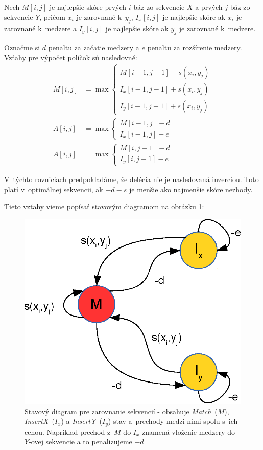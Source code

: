 Nech $M[i,j]$ je najlepšie skóre prvých $i$ báz zo sekvencie $X$ a prvých $j$ báz zo sekvencie $Y$, pričom $x_i$ je zarovnané k~$y_j$, $I_x[i,j]$ je najlepšie skóre ak $x_i$ je zarovnané k~medzere a $I_y[i,j]$ je najlepšie skóre ak $y_j$ je zarovnané k~medzere.

Označme si $d$ penaltu za začatie medzery a $e$ penaltu za rozšírenie medzery. Vzťahy pre výpočet políčok sú nasledovné:
\begin{align*}
M[i,j] &= \max \left\{
\begin{array}{l}
M[i-1,j-1]+s(x_i, y_j)\\
I_x[i-1,j-1]+s(x_i, y_j)\\
I_y[i-1,j-1]+s(x_i, y_j)
\end{array} \right.\\
A[i,j] &= \max \left\{
\begin{array}{l}
M[i-1,j]-d\\
I_x[i-1,j]-e
\end{array} \right.\\
A[i,j] &= \max \left\{
\begin{array}{l}
M[i,j-1]-d\\
I_y[i,j-1]-e
\end{array} \right.
\end{align*}

V~týchto rovniciach predpokladáme, že delécia nie je nasledovaná inzerciou. Toto platí v~optimálnej sekvencii, ak $-d-s$ je menšie ako najmenšie skóre nezhody.

Tieto vzťahy vieme popísať stavovým diagramom na obrázku \ref{fig:alignment-fsa}:
\begin{figure}[h]
    \centering
    \includegraphics[width=.4\textwidth]{images/alignment_fsa}
    \caption[Stavový diagram pre zarovnanie sekvencií]{Stavový diagram pre zarovnanie sekvencií - obsahuje \textit{Match}~($M$), \textit{InsertX}~($I_x$) a \textit{InsertY}~($I_y$) stav a~prechody medzi nimi spolu s~ich cenou. Napríklad prechod z~$M$ do $I_x$ znamená vloženie medzery do $Y$-ovej sekvencie a to penalizujeme $-d$}
    \label{fig:alignment-fsa}
\end{figure}

